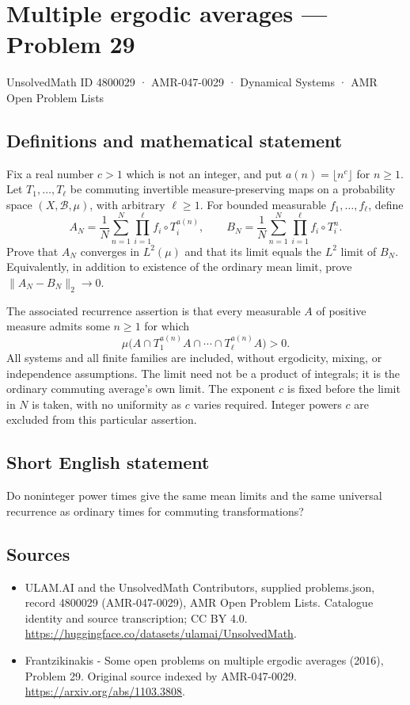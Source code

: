 \documentclass[11pt,a4paper]{article}
\begin{document}
\section*{Multiple ergodic averages — Problem 29}\label{4800029}
{\small UnsolvedMath ID 4800029 · AMR-047-0029 · Dynamical Systems · AMR Open Problem Lists}
\subsection{Definitions and mathematical statement}
Fix a real number $c>1$ which is not an integer,
and put $a(n)=\lfloor n^c\rfloor$ for $n\ge1$.
Let $T_1,\ldots,T_\ell$ be commuting invertible
measure-preserving maps on a probability space
$(X,\mathcal B,\mu)$, with arbitrary $\ell\ge1$.
For bounded measurable $f_1,\ldots,f_\ell$, define
\[
 A_N=\frac1N\sum_{n=1}^N\prod_{i=1}^\ell f_i\circ T_i^{a(n)},
 \qquad
 B_N=\frac1N\sum_{n=1}^N\prod_{i=1}^\ell f_i\circ T_i^n.
\]
Prove that $A_N$ converges in $L^2(\mu)$ and
that its limit equals the $L^2$ limit of $B_N$.
Equivalently, in addition to existence of the
ordinary mean limit, prove $\|A_N-B_N\|_2\to0$.

The associated recurrence assertion is that every
measurable $A$ of positive measure admits some
$n\ge1$ for which
\[
       \mu\bigl(A\cap T_1^{a(n)}A\cap\cdots
                             \cap T_\ell^{a(n)}A\bigr)>0.
\]
All systems and all finite families are included,
without ergodicity, mixing, or independence
assumptions. The limit need not be a product
of integrals; it is the ordinary commuting
average's own limit. The exponent $c$ is fixed
before the limit in $N$ is taken, with no
uniformity as $c$ varies required. Integer powers
$c$ are excluded from this particular assertion.
\subsection{Short English statement}
Do noninteger power times give the same mean limits and the same universal recurrence as ordinary times for commuting transformations?
\subsection{Sources}
\begin{itemize}
\item[S1] ULAM.AI and the UnsolvedMath Contributors, supplied problems.json, record 4800029 (AMR-047-0029), AMR Open Problem Lists. Catalogue identity and source transcription; CC BY 4.0.
\url{https://huggingface.co/datasets/ulamai/UnsolvedMath}.
\item[S2] Frantzikinakis - Some open problems on multiple ergodic averages (2016), Problem 29. Original source indexed by AMR-047-0029.
\url{https://arxiv.org/abs/1103.3808}.
\end{itemize}
\end{document}
